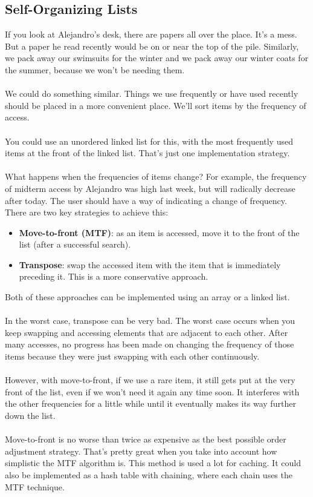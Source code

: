 \documentclass[]{article}
\theoremstyle{definition}
\begin{document}
		\subsection{Self-Organizing Lists}
			If you look at Alejandro's desk, there are papers all over the place. It's a mess. But a paper he read recently would be on or near the top of the pile. Similarly, we pack away our swimsuits for the winter and we pack away our winter coats for the summer, because we won't be needing them.
			\\ \\
			We could do something similar. Things we use frequently or have used recently should be placed in a more convenient place. We'll sort items by the frequency of access.
			\\ \\
			You could use an unordered linked list for this, with the most frequently used items at the front of the linked list. That's just one implementation strategy.
			\\ \\
			What happens when the frequencies of items change? For example, the frequency of midterm access by Alejandro was high last week, but will radically decrease after today. The user should have a way of indicating a change of frequency. There are two key strategies to achieve this:
			\begin{itemize}
				\item \textbf{Move-to-front (MTF)}: as an item is accessed, move it to the front of the list (after a successful search).
				\item \textbf{Transpose}: swap the accessed item with the item that is immediately preceding it. This is a more conservative approach.
			\end{itemize}

			Both of these approaches can be implemented using an array or a linked list.
			\\ \\
			In the worst case, transpose can be very bad. The worst case occurs when you keep swapping and accessing elements that are adjacent to each other. After many accesses, no progress has been made on changing the frequency of those items because they were just swapping with each other continuously.
			\\ \\
			However, with move-to-front, if we use a rare item, it still gets put at the very front of the list, even if we won't need it again any time soon. It interferes with the other frequencies for a little while until it eventually makes its way further down the list.
			\\ \\
			Move-to-front is no worse than twice as expensive as the best possible order adjustment strategy. That's pretty great when you take into account how simplistic the MTF algorithm is. This method is used a lot for caching. It could also be implemented as a hash table with chaining, where each chain uses the MTF technique.
\end{document}
